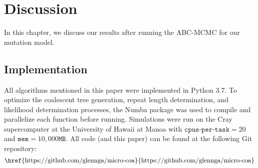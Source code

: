 \chapter{Discussion}\label{ch:discussion}
In this chapter, we discuss our results after running the ABC-MCMC for our mutation model.

\section{Implementation}\label{sec:implementation}
All algorithms mentioned in this paper were implemented in Python 3.7.
To optimize the coalescent tree generation, repeat length determination, and likelihood determination processes, the
Numba package was used to compile and parallelize each function before running.
Simulations were run on the Cray supercomputer at the University of Hawaii at Manoa with $\texttt{cpus-per-task} = 20$
and $\texttt{mem}=10,000\texttt{MB}$.
All code (and this paper) can be found at the following Git repository:
\begin{equation*}
    \text{\href{https://github.com/glennga/micro-coa}{https://github.com/glennga/micro-coa}}
\end{equation*}

